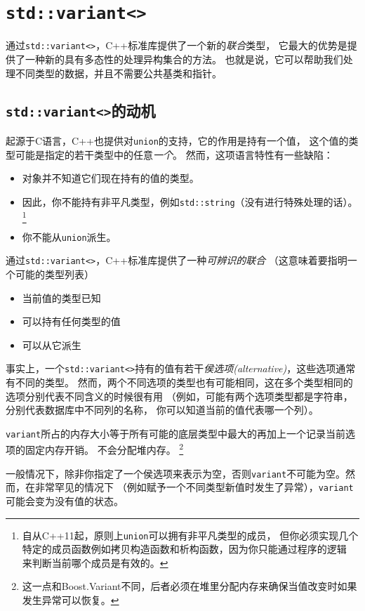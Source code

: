 \section{\texttt{std::variant<>}}\label{ch16}
通过\texttt{std::variant<>}，C++标准库提供了一个新的\emph{联合}类型，
它最大的优势是提供了一种新的具有多态性的处理异构集合的方法。
也就是说，它可以帮助我们处理不同类型的数据，并且不需要公共基类和指针。

\subsection{\texttt{std::variant<>}的动机}
起源于C语言，C++也提供对\texttt{union}的支持，它的作用是持有一个值，
这个值的类型可能是指定的若干类型中的任意\emph{一个}。
然而，这项语言特性有一些缺陷：
\begin{itemize}[leftmargin=*]
    \item 对象并不知道它们现在持有的值的类型。
    \item 因此，你不能持有非平凡类型，例如\texttt{std::string}（没有进行特殊处理的话）。
    \footnote{自从C++11起，原则上\texttt{union}可以拥有非平凡类型的成员，
    但你必须实现几个特定的成员函数例如拷贝构造函数和析构函数，因为你只能通过程序的逻辑
    来判断当前哪个成员是有效的。}
    \item 你不能从\texttt{union}派生。
\end{itemize}
通过\texttt{std::variant<>}，C++标准库提供了一种\emph{可辨识的联合}
（这意味着要指明一个可能的类型列表）
\begin{itemize}[leftmargin=*]
    \item 当前值的类型已知
    \item 可以持有任何类型的值
    \item 可以从它派生
\end{itemize}
事实上，一个\texttt{std::variant<>}持有的值有若干\emph{侯选项(alternative)}，这些选项通常有不同的类型。
然而，两个不同选项的类型也有可能相同，这在多个类型相同的选项分别代表不同含义的时候很有用
（例如，可能有两个选项类型都是字符串，分别代表数据库中不同列的名称，
你可以知道当前的值代表哪一个列）。

\texttt{variant}所占的内存大小等于所有可能的底层类型中最大的再加上一个记录当前选项的固定内存开销。
不会分配堆内存。
\footnote{这一点和Boost.Variant不同，后者必须在堆里分配内存来确保当值改变时如果发生异常可以恢复。}

一般情况下，除非你指定了一个侯选项来表示为空，否则\texttt{variant}不可能为空。然而，在非常罕见的情况下
（例如赋予一个不同类型新值时发生了异常），\texttt{variant}可能会变为没有值的状态。

